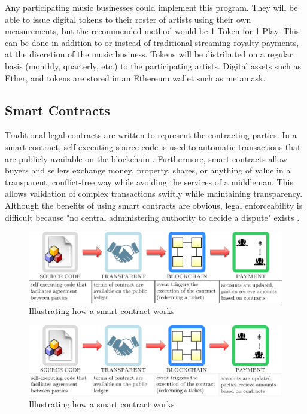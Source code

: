 \documentclass[12pt,tightenlines,letterpaper]{scrartcl}
\begin{document}
Any participating music businesses could implement this program. They will be able to issue digital tokens to their roster of artists using their own measurements, but the recommended method would be 1 Token for 1 Play. This can be done in addition to or instead of traditional streaming royalty payments, at the discretion of the music business. Tokens will be distributed on a regular basis (monthly, quarterly, etc.) to the participating artists. 
Digital assets such as Ether, and tokens are stored in an Ethereum wallet such as metamask.


\subsection{Smart Contracts}
		Traditional legal contracts are written to represent the contracting parties. In a smart contract, self-executing source code is used to automatic transactions that are publicly available on the blockchain \cite{ethereumWhitePaper:Online}.
		Furthermore, \glspl{smart contract} allow buyers and sellers exchange money, property, shares, or anything of value in a transparent, conflict-free way while avoiding the services of a middleman. This allows validation of complex transactions swiftly while maintaining transparency. Although the benefits of using smart contracts are obvious, legal enforceability is difficult because "no central administering authority to decide a dispute" exists \cite{keyfindings:Online}. 


\begin{warpprint}
	\begin{figure}[ht]
		\centering
		\includegraphics[width=1\linewidth]{smartContractsExp.pdf}
		\caption{Illustrating how a smart contract works}
		\label{fig:smartContracts}
	\end{figure}
\end{warpprint}

\begin{warpHTML}
	\begin{figure}[ht]
		\centering
		\includegraphics[width=1\linewidth]{smartContractsExp.svg}
		\caption{Illustrating how a smart contract works}
		\label{fig:smartContracts}
	\end{figure}
\end{warpHTML}
\end{document}
